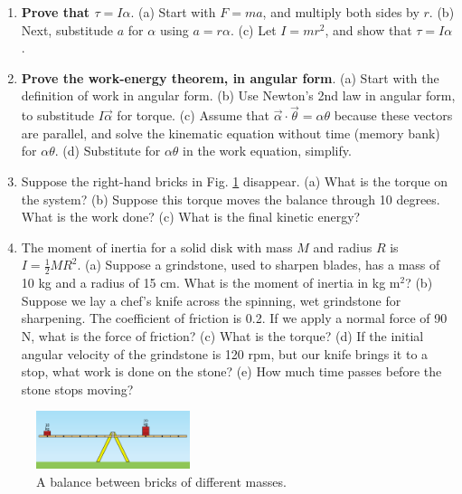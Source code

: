 \documentclass{article}
\begin{document}
\begin{enumerate}
\item \textbf{Prove that $\tau = I\alpha$}.  (a) Start with $F = ma$, and multiply both sides by $r$.  (b) Next, substitude $a$ for $\alpha$ using $a = r\alpha$.  (c) Let $I = mr^2$, and show that $\tau = I \alpha$. \\ \vspace{2.5cm}
\item \textbf{Prove the work-energy theorem, in angular form}. (a) Start with the definition of work in angular form.  (b) Use Newton's 2nd law in angular form, to substitude $I\vec{\alpha}$ for torque. (c) Assume that $\vec{\alpha} \cdot \vec{\theta} = \alpha\theta$ because these vectors are parallel, and solve the kinematic equation without time (memory bank) for $\alpha\theta$. (d) Substitute for $\alpha\theta$ in the work equation, simplify. \\ \vspace{2.5cm}
\item Suppose the right-hand bricks in Fig. \ref{fig:1} disappear.  (a) What is the torque on the system? (b) Suppose this torque moves the balance through 10 degrees.  What is the work done? (c) What is the final kinetic energy? \\ \vspace{2.5cm}
\item The moment of inertia for a solid disk with mass $M$ and radius $R$ is $I = \frac{1}{2}MR^2$.  (a) Suppose a grindstone, used to sharpen blades, has a mass of 10 kg and a radius of 15 cm.  What is the moment of inertia in kg m$^2$? (b) Suppose we lay a chef's knife across the spinning, wet grindstone for sharpening.  The coefficient of friction is 0.2.  If we apply a normal force of 90 N, what is the force of friction? (c) What is the torque? (d) If the initial angular velocity of the grindstone is 120 rpm, but our knife brings it to a stop, what work is done on the stone? (e) How much time passes before the stone stops moving? \\ \vspace{2.5cm}
\end{enumerate}

\begin{figure}
\centering
\includegraphics[width=0.4\textwidth]{figures/brick.png}
\caption{\label{fig:1} A balance between bricks of different masses.}
\end{figure}
\end{document}
